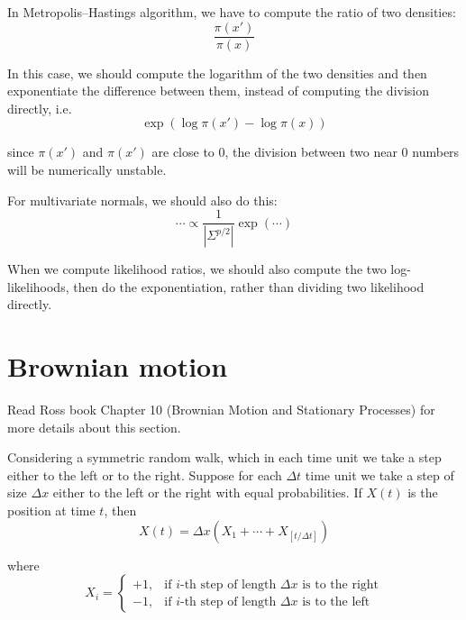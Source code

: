 \documentclass[12pt]{report}
\begin{document}
In Metropolis--Hastings algorithm, we have to compute the ratio of two densities:
\begin{equation}
	\frac{\pi (x')}{\pi(x)}
\end{equation}

In this case, we should compute the logarithm of the two densities and then exponentiate the difference between them, instead of computing the division directly, i.e.
\begin{equation}
	\exp (\log \pi(x') - \log \pi(x))
\end{equation}

since $\pi(x')$ and $\pi(x')$ are close to $0$, the division between two near 0 numbers will be numerically unstable.

\vskip 0.1in

For multivariate normals, we should also do this:
\begin{equation}
	\cdots \propto \frac{1}{|\Sigma^{p/2}|} \exp (\cdots)
\end{equation}

When we compute likelihood ratios, we should also compute the two log-likelihoods, then do the exponentiation, rather than dividing two likelihood directly.

\section{Brownian motion}

Read Ross book Chapter 10 (Brownian Motion and Stationary Processes) for more details about this section.

\vskip 0.1in

Considering a symmetric random walk, which in each time unit we take a step either to the left or to the right. Suppose for each $\Delta t$ time unit we take a step of size $\Delta x$ either to the left or the right with equal probabilities. If $X(t)$ is the position at time $t$, then
\begin{equation}
	X(t) = \Delta x (X_1 + \cdots + X_{[ t / \Delta t ]})
\end{equation}

where
\begin{equation}
	X_i = \begin{cases}
		+1, & \text{if} \,\, i\text{-th step of length} \,\, \Delta x \,\, \text{is to the right}\\
		-1, & \text{if} \,\, i\text{-th step of length} \,\, \Delta x \,\, \text{is to the left}
	\end{cases}
\end{equation}
\end{document}
